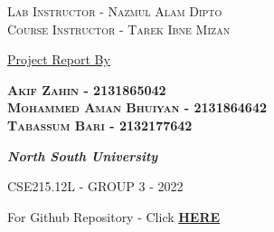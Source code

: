 \documentclass[a4paper,12pt]{article}
\begin{document}
\begin{titlepage}
	
	{\scshape\large  Lab Instructor - Nazmul Alam Dipto \\Course Instructor - Tarek Ibne Mizan \\}
	
        \vspace*{\baselineskip} %
	
	
	\huge\underline{Project Report By} 
	
	\vspace{0.5\baselineskip} %
	
	{\scshape\large \textbf{Akif Zahin - 2131865042 \\ Mohammed Aman Bhuiyan - 2131864642 \\ Tabassum Bari - 2132177642 \\} } %
	
	\vspace{0.5\baselineskip} %
	
	\textit{\large \textbf{North South University }  } %
	
	\vfill %
        
        
	
	
	
        
        \vspace{-1em}
        \small {CSE215.12L - GROUP 3 - 2022} %
         
         \vspace{0.3\baselineskip} %

\end{titlepage}

\tableofcontents
\vspace{3cm}
\begin{center}
    \large For Github Repository - Click \href{https://github.com/akifzahin/CSE215.12L-Group-3-School-Management-System}{\textbf{HERE}} 
\end{center}
\end{document}
